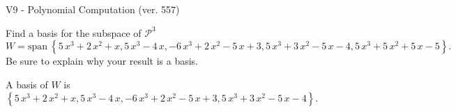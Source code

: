 \begin{exercise}
  \begin{exerciseTitle}V9 - Polynomial Computation (ver. 557)\end{exerciseTitle}
  \begin{exerciseStatement}
    Find a basis for the subspace of \(\mathcal{P}^3\) 
\[W=\mathrm{span}\ \left\{5 \, x^{3} + 2 \, x^{2} + x , 5 \, x^{3} - 4 \, x , -6 \, x^{3} + 2 \, x^{2} - 5 \, x + 3 , 5 \, x^{3} + 3 \, x^{2} - 5 \, x - 4 , 5 \, x^{3} + 5 \, x^{2} + 5 \, x - 5\right\}.\]
 Be sure to explain why your result is a basis.


  \end{exerciseStatement}
  \begin{exerciseAnswer}
   A basis of \(W\) is  \(\left\{5 \, x^{3} + 2 \, x^{2} + x , 5 \, x^{3} - 4 \, x , -6 \, x^{3} + 2 \, x^{2} - 5 \, x + 3 , 5 \, x^{3} + 3 \, x^{2} - 5 \, x - 4\right\}\).
  


  \end{exerciseAnswer}
\end{exercise}